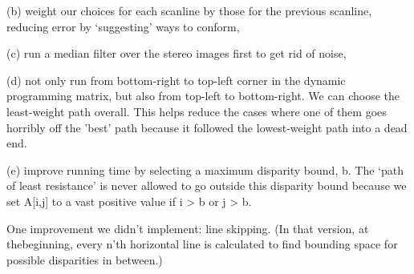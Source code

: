 (b) weight our choices for each scanline by those for the previous scanline, reducing error by `suggesting' ways to conform,

(c) run a median filter over the stereo images first to get rid of noise,

(d) not only run from bottom-right to top-left corner in the dynamic programming matrix, but also from top-left to bottom-right. We can choose the least-weight path overall. This helps reduce the cases where one of them goes horribly off the 'best' path because it followed the lowest-weight path into a dead end.

(e) improve running time by selecting a maximum disparity bound, b. The `path of least resistance' is never allowed to go outside this disparity bound because we set A[i,j] to a vast positive value if i > b or j > b.

%

One improvement we didn't implement: line skipping. (In that version, at thebeginning, every n’th horizontal line is calculated to find bounding space for possible disparities in between.)
